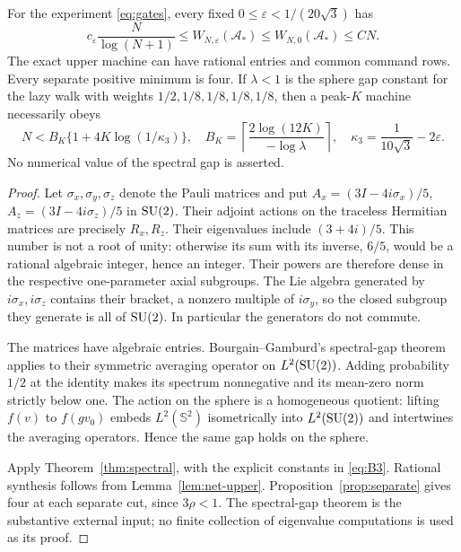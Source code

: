 \begin{theorem}\label{thm:rational}
For the experiment \eqref{eq:gates}, every fixed
$0\le\varepsilon<1/(20\sqrt3)$ has
\begin{equation}\label{eq:rational-rate}
 c_\varepsilon\frac N{\log(N+1)}
 \le W_{N,\varepsilon}(\mathcal A_*)
 \le W_{N,0}(\mathcal A_*)\le CN.
\end{equation}
The exact upper machine can have rational entries and common command
rows. Every separate positive minimum is four. If $\lambda<1$ is the
sphere gap constant for the lazy walk with weights $1/2,1/8,1/8,1/8,1/8$,
then a peak-$K$ machine necessarily obeys
\begin{equation}\label{eq:rational-finite}
 N<B_K\{1+4K\log(1/\kappa_3)\},
 \quad B_K=\left\lceil\frac{2\log(12K)}{-\log\lambda}\right\rceil,
 \quad \kappa_3=\frac1{10\sqrt3}-2\varepsilon.
\end{equation}
No numerical value of the spectral gap is asserted.
\end{theorem}
\begin{proof}
Let $\sigma_x,\sigma_y,\sigma_z$ denote the Pauli matrices and put
$A_x=(3I-4i\sigma_x)/5$, $A_z=(3I-4i\sigma_z)/5$ in $\operatorname{SU}(2)$.
Their adjoint actions on the traceless Hermitian matrices are precisely
$R_x,R_z$. Their eigenvalues include $(3+4i)/5$. This number is not a
root of unity: otherwise its sum with its inverse, $6/5$, would be a
rational algebraic integer, hence an integer. Their powers are therefore
dense in the respective one-parameter axial subgroups. The Lie algebra
generated by $i\sigma_x,i\sigma_z$ contains their bracket, a nonzero
multiple of $i\sigma_y$, so the closed subgroup they generate is all
of $\operatorname{SU}(2)$. In particular the generators do not commute.

The matrices have algebraic entries. Bourgain--Gamburd's spectral-gap
theorem \cite[Theorem~1]{BG12} applies to their symmetric averaging
operator on $L^2(\operatorname{SU}(2))$. Adding probability $1/2$ at the identity
makes its spectrum nonnegative and its mean-zero norm strictly below
one. The action on the sphere is a homogeneous quotient: lifting
$f(v)$ to $f(gv_0)$ embeds $L^2(\mathbb S^2)$ isometrically into
$L^2(\operatorname{SU}(2))$ and intertwines the averaging operators. Hence the same
gap holds on the sphere.

Apply Theorem~\ref{thm:spectral}, with the explicit constants in
\eqref{eq:B3}. Rational synthesis follows from Lemma~\ref{lem:net-upper}.
Proposition~\ref{prop:separate} gives four at each separate cut, since
$3\rho<1$. The spectral-gap theorem is the substantive external input;
no finite collection of eigenvalue computations is used as its proof.
\end{proof}

